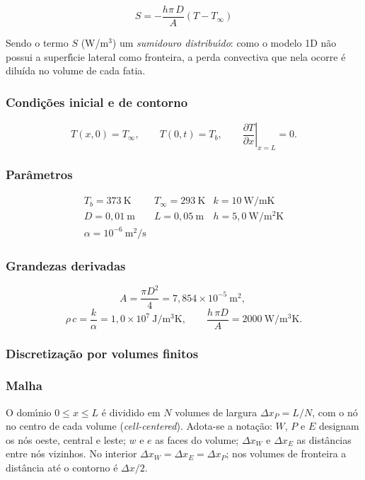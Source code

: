 \vspace{0.1cm}

\begin{equation}
    S=-\frac{h\pi\,D}{A}\left(T-T_\infty\right)
\end{equation}

\vspace{0.1cm}

Sendo o termo $S$ (W/m$^3$) um \emph{sumidouro distribu\'{\i}do}: como o modelo 1D n\~ao possui a superf\'{\i}cie lateral como fronteira, a perda convectiva que nela ocorre \'e diluída no volume de cada fatia.

\subsubsection*{Condi\c{c}\~oes inicial e de contorno}
\[
  T(x,0)=T_\infty ,\qquad
  T(0,t)=T_b ,\qquad
  \left.\frac{\partial T}{\partial x}\right|_{x=L}=0 .
\]

\subsubsection*{Par\^ametros}

\[
\begin{array}{lll}
  T_b=373\ \mathrm{K} & T_\infty=293\ \mathrm{K} & k=10\ \mathrm{W/mK}\\[2pt]
  D=0{,}01\ \mathrm{m} & L=0{,}05\ \mathrm{m} & h=5{,}0\ \mathrm{W/m^2K}\\[2pt]
  \alpha=10^{-6}\ \mathrm{m^2/s} & & 
\end{array}
\]
\subsubsection*{Grandezas derivadas}
\[
  A=\frac{\pi D^{2}}{4}=7{,}854\times10^{-5}\ \mathrm{m^{2}},\
\]
\[
  \rho\, c=\frac{k}{\alpha}=1{,}0\times10^{7}\ \mathrm{J/m^{3}K},
  \qquad
  \frac{h\,\pi D}{A}=2000\ \mathrm{W/m^{3}K}.
\]

\subsubsection*{Discretiza\c{c}\~ao por volumes finitos}

\subsubsection*{Malha}

O dom\'{\i}nio $0\le x\le L$ \'e dividido em $N$ volumes de largura
$\Delta x_P=L/N$, com o n\'o no centro de cada volume
(\emph{cell-centered}). Adota-se a nota\c{c}\~ao: $W$, $P$ e $E$
designam os n\'os oeste, central e leste; $w$ e $e$ as faces do volume;
$\Delta x_W$ e $\Delta x_E$ as dist\^ancias entre n\'os vizinhos. No interior
$\Delta x_W=\Delta x_E=\Delta x_P$; nos volumes de fronteira a dist\^ancia at\'e
o contorno \'e $\Delta x/2$.

